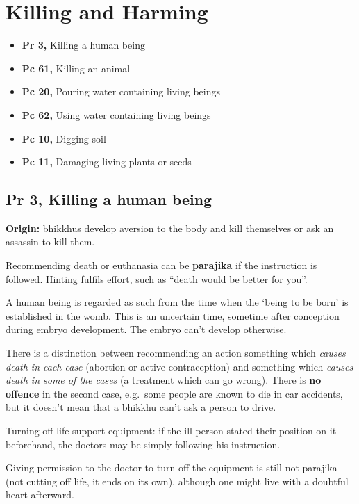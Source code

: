 \chapter{Killing and Harming}

\begin{itemize}
\tightlist
\item
  \textbf{Pr 3,} Killing a human being
\item
  \textbf{Pc 61,} Killing an animal
\item
  \textbf{Pc 20,} Pouring water containing living beings
\item
  \textbf{Pc 62,} Using water containing living beings
\item
  \textbf{Pc 10,} Digging soil
\item
  \textbf{Pc 11,} Damaging living plants or seeds
\end{itemize}

\section{Pr 3, Killing a human being}


\textbf{Origin:} bhikkhus develop aversion to the body and kill
themselves or ask an assassin to kill them.

Recommending death or euthanasia can be \textbf{parajika} if the
instruction is followed. Hinting fulfils effort, such as ``death would
be better for you''.

A human being is regarded as such from the time when the `being to be
born' is established in the womb. This is an uncertain time, sometime
after conception during embryo development. The embryo can't develop
otherwise.

There is a distinction between recommending an action something which
\emph{causes death in each case} (abortion or active contraception) and
something which \emph{causes death in some of the cases} (a treatment
which can go wrong). There is \textbf{no offence} in the second case,
e.g.~some people are known to die in car accidents, but it doesn't mean
that a bhikkhu can't ask a person to drive.

Turning off life-support equipment: if the ill person stated their
position on it beforehand, the doctors may be simply following his
instruction.

Giving permission to the doctor to turn off the equipment is still not
parajika (not cutting off life, it ends on its own), although one might
live with a doubtful heart afterward.

